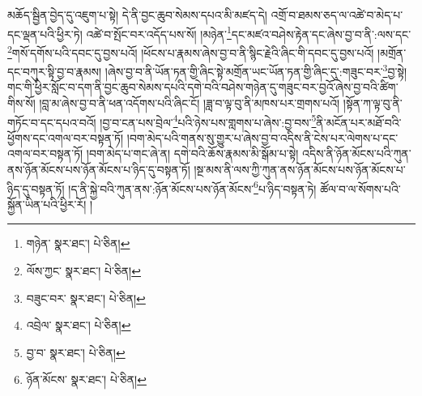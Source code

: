 མཆོད་སྦྱིན་བྱེད་དུ་འཇུག་པ་སྟེ། དེ་ནི་བྱང་ཆུབ་སེམས་དཔའ་མི་མཛད་དེ། འགྲོ་བ་ཐམས་ཅད་ལ་འཚེ་བ་མེད་པ་དང་ལྡན་པའི་ཕྱིར་ཏེ། འཚེ་བ་སྤོང་བར་འདོད་པས་སོ། །མཉེན་\footnote{གཉེན་  སྣར་ཐང་།  པེ་ཅིན། }དང་མཛའ་བཤེས་རྟེན་དང་ཞེས་བྱ་བ་ནི་:ལས་དང་\footnote{ལོས་ཀྱང་  སྣར་ཐང་།  པེ་ཅིན། }གསོ་དགོས་པའི་དབང་དུ་བྱས་པའོ། །ཕོངས་པ་རྣམས་ཞེས་བྱ་བ་ནི་སྙིང་རྗེའི་ཞིང་གི་དབང་དུ་བྱས་པའོ། །མགྲོན་དང་བཀུར་སྟི་བྱ་བ་རྣམས། །ཞེས་བྱ་བ་ནི་ཡོན་ཏན་གྱི་ཞིང་སྟེ་མགྲོན་ཡང་ཡོན་ཏན་གྱི་ཞིང་དུ་:གཟུང་བར་\footnote{བཟུང་བར་  སྣར་ཐང་།  པེ་ཅིན། }བྱ་སྟེ། གང་གི་ཕྱིར་སློང་བ་དག་ནི་བྱང་ཆུབ་སེམས་དཔའི་དགེ་བའི་བཤེས་གཉེན་དུ་གཟུང་བར་བྱའོ་ཞེས་བྱ་བའི་ཚིག་གིས་སོ། །བླ་མ་ཞེས་བྱ་བ་ནི་ཕན་འདོགས་པའི་ཞིང་ངོ། །ཟླ་བ་ལྟ་བུ་ནི་མཁས་པར་གྲགས་པའོ། །སྟོན་ཀ་ལྟ་བུ་ནི་གཏོང་བ་དང་དཔའ་བའོ། །བྱ་བ་ངན་པས་བྲེལ་\footnote{འབྲེལ་  སྣར་ཐང་།  པེ་ཅིན། }པའི་ཉེས་པས་གླགས་པ་ཞེས་:བྱ་བས་\footnote{བྱ་བ་  སྣར་ཐང་།  པེ་ཅིན། }ནི་མངོན་པར་མཐོ་བའི་ཕྱོགས་དང་འགལ་བར་བསྟན་ཏོ། །བག་མེད་པའི་གནས་སུ་གྱུར་པ་ཞེས་བྱ་བ་འདིས་ནི་ངེས་པར་ལེགས་པ་དང་འགལ་བར་བསྟན་ཏོ། །བག་མེད་པ་གང་ཞེ་ན། དགེ་བའི་ཆོས་རྣམས་མི་སྒོམ་པ་སྟེ། འདིས་ནི་ཉོན་མོངས་པའི་ཀུན་ནས་ཉོན་མོངས་པས་ཉོན་མོངས་པ་ཉིད་དུ་བསྟན་ཏོ། །སྔ་མས་ནི་ལས་ཀྱི་ཀུན་ནས་ཉོན་མོངས་པས་ཉོན་མོངས་པ་ཉིད་དུ་བསྟན་ཏོ། །ད་ནི་སྐྱེ་བའི་ཀུན་ནས་:ཉོན་མོངས་པས་ཉོན་མོངས་\footnote{ཉོན་མོངས་  སྣར་ཐང་།  པེ་ཅིན། }པ་ཉིད་བསྟན་ཏེ། ཚོལ་བ་ལ་སོགས་པའི་སྐྱོན་ཡིན་པའི་ཕྱིར་རོ། །

